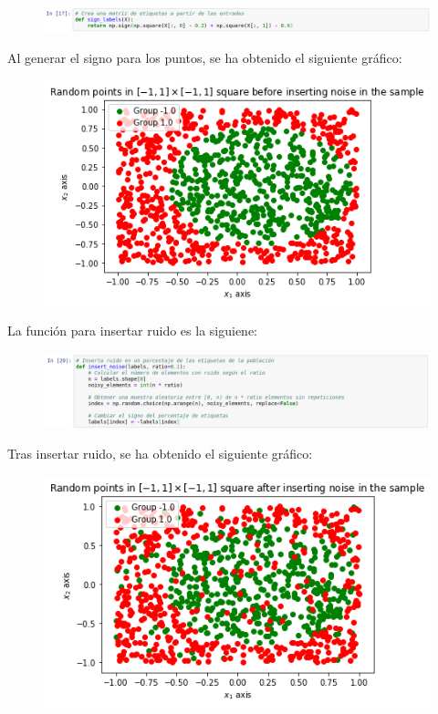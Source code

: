 \documentclass[11pt,a4paper]{article}
\begin{document}
\begin{itemize}
	\begin{figure}[H]
	\centering
	\includegraphics[scale=0.4]{img/sign_func.png}
	\end{figure}
	
	Al generar el signo para los puntos, se ha obtenido el siguiente gráfico:
	
	\begin{figure}[H]
	\centering
	\includegraphics[scale=0.6]{img/sign_points.png}
	\end{figure}
	
	La función para insertar ruido es la siguiene:
	
	\begin{figure}[H]
	\centering
	\includegraphics[scale=0.4]{img/noise_func.png}
	\end{figure}
	
	Tras insertar ruido, se ha obtenido el siguiente gráfico:
	
	\begin{figure}[H]
	\centering
	\includegraphics[scale=0.6]{img/random_noise.png}
	\end{figure}
	

\end{itemize}
\end{document}
